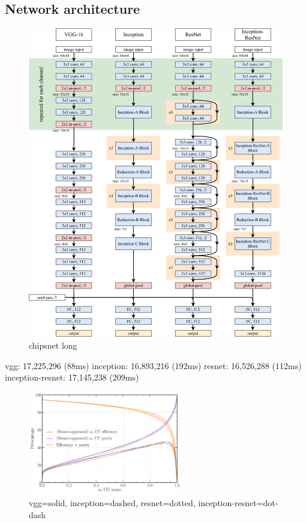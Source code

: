 \subsection{Network architecture} %
\label{sec:cvn_baseline_architecture} %

\begin{figure} %
    \includegraphics[width=\textwidth]{diagrams/7-cvn/chipsnet.pdf}
    \caption[chipsnet short]
    {chipsnet long}
    \label{fig:chipsnet}
\end{figure}

vgg: 17,225,296 (88ms)
inception: 16,893,216 (192ms)
resnet: 16,526,288 (112ms)
inception-resnet: 17,145,238 (209ms)

\begin{figure} %
    \includegraphics[width=0.6\textwidth]{diagrams/7-cvn/chipsnet/arch_nuel_eff_curves.pdf}
    \caption[arch nuel eff curves short]
    {vgg=solid, inception=dashed, resnet=dotted, inception-resnet=dot-dash}
    \label{fig:arch_nuel_eff_curves}
\end{figure}

